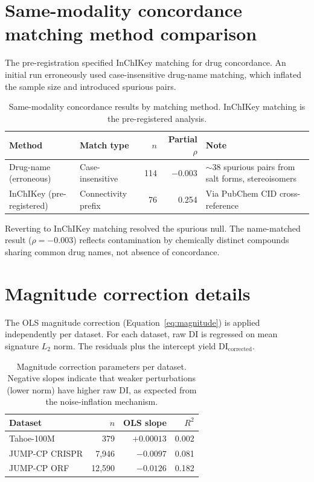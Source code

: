 \documentclass[11pt]{article}
\begin{document}
\section{Same-modality concordance matching method comparison}
\label{app:a1matching}

The pre-registration specified InChIKey matching for drug concordance.
An initial run erroneously used case-insensitive drug-name matching,
which inflated the sample size and introduced spurious pairs.

\vspace{1em}
\begin{table}[h]
\centering
\caption{Same-modality concordance results by matching method.  InChIKey
matching is the pre-registered analysis.}
\label{tab:a1match}
\small
\begin{tabular}{llrrp{4cm}}
\toprule
Method & Match type & $n$ & Partial $\rho$ & Note \\
\midrule
Drug-name (erroneous) & Case-insensitive & 114 & $-0.003$ &
  ${\sim}$38 spurious pairs from salt forms, stereoisomers \\
InChIKey (pre-registered) & Connectivity prefix & 76 & 0.254 &
  Via PubChem CID cross-reference \\
\bottomrule
\end{tabular}
\end{table}

Reverting to InChIKey matching resolved the spurious null.  The
name-matched result ($\rho = -0.003$) reflects contamination by
chemically distinct compounds sharing common drug names, not absence of
concordance.

\section{Magnitude correction details}
\label{app:magnitude}

The OLS magnitude correction (Equation~\ref{eq:magnitude}) is applied
independently per dataset.  For each dataset, raw DI is regressed on
mean signature $L_2$ norm.  The residuals plus the intercept yield
$\mathrm{DI}_{\mathrm{corrected}}$.

\vspace{1em}
\begin{table}[h]
\centering
\caption{Magnitude correction parameters per dataset.  Negative slopes
indicate that weaker perturbations (lower norm) have higher raw DI, as
expected from the noise-inflation mechanism.}
\label{tab:magcorr}
\small
\begin{tabular}{lrrr}
\toprule
Dataset & $n$ & OLS slope & $R^2$ \\
\midrule
Tahoe-100M & 379 & $+0.00013$ & 0.002 \\
JUMP-CP CRISPR & 7{,}946 & $-0.0097$ & 0.081 \\
JUMP-CP ORF & 12{,}590 & $-0.0126$ & 0.182 \\
\bottomrule
\end{tabular}
\end{table}
\end{document}
